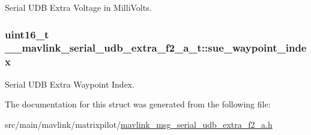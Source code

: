 Serial U\+D\+B Extra Voltage in Milli\+Volts. 

\hypertarget{struct____mavlink__serial__udb__extra__f2__a__t_a799b9135acca637bc0bd8833071399d1}{
\subsubsection[{sue\+\_\+waypoint\+\_\+index}]{\setlength{\rightskip}{0pt plus 5cm}uint16\+\_\+t \+\_\+\+\_\+mavlink\+\_\+serial\+\_\+udb\+\_\+extra\+\_\+f2\+\_\+a\+\_\+t\+::sue\+\_\+waypoint\+\_\+index}}\label{struct____mavlink__serial__udb__extra__f2__a__t_a799b9135acca637bc0bd8833071399d1}


Serial U\+D\+B Extra Waypoint Index. 



The documentation for this struct was generated from the following file\+:\begin{DoxyCompactItemize}
\item 
src/main/mavlink/matrixpilot/\hyperlink{mavlink__msg__serial__udb__extra__f2__a_8h}{mavlink\+\_\+msg\+\_\+serial\+\_\+udb\+\_\+extra\+\_\+f2\+\_\+a.\+h}\end{DoxyCompactItemize}
